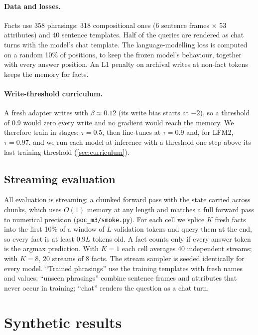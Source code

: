 \documentclass[11pt]{article}
\newcommand{\tauw}{\tau}
\begin{document}
\paragraph{Data and losses.} Facts use 358 phrasings: 318 compositional ones (6 sentence frames $\times$ 53 attributes) and 40 sentence templates. Half of the queries are rendered as chat turns with the model's chat template. The language-modelling loss is computed on a random 10\% of positions, to keep the frozen model's behaviour, together with every answer position. An L1 penalty on archival writes at non-fact tokens keeps the memory for facts.

\paragraph{Write-threshold curriculum.} A fresh adapter writes with $\beta \approx 0.12$ (its write bias starts at $-2$), so a threshold of 0.9 would zero every write and no gradient would reach the memory. We therefore train in stages: $\tauw = 0.5$, then fine-tunes at $\tauw = 0.9$ and, for LFM2, $\tauw = 0.97$, and we run each model at inference with a threshold one step above its last training threshold (\cref{sec:curriculum}).

\subsection{Streaming evaluation}
\label{sec:eval}
All evaluation is streaming: a chunked forward pass with the state carried across chunks, which uses $O(1)$ memory at any length and matches a full forward pass to numerical precision (\texttt{poc\_m3/smoke.py}). For each cell we splice $K$ fresh facts into the first 10\% of a window of $L$ validation tokens and query them at the end, so every fact is at least $0.9L$ tokens old. A fact counts only if every answer token is the argmax prediction. With $K = 1$ each cell averages 40 independent streams; with $K = 8$, 20 streams of 8 facts. The stream sampler is seeded identically for every model. ``Trained phrasings'' use the training templates with fresh names and values; ``unseen phrasings'' combine sentence frames and attributes that never occur in training; ``chat'' renders the question as a chat turn.

\section{Synthetic results}
\label{sec:synthetic}
\end{document}
